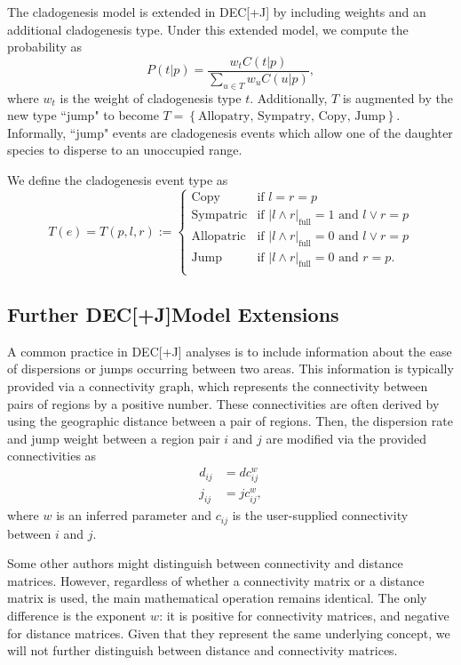 \documentclass[a4paper]{article}
\newcommand{\CountFull}[1]{|#1|_\text{full}}
\newcommand{\decj}{DEC[+J]}
\newcommand{\rand}[2]{#1 \land #2}
\newcommand{\ror}[2]{#1 \lor #2}
\begin{document}
The cladogenesis model is extended in \decj{} by including weights and an additional cladogenesis type.
Under this extended model, we compute the probability as 
\begin{equation}
	P(t | p) = \frac{w_t C(t | p)}{\sum_{u \in T} w_u C(u | p)},
\end{equation}
where $w_t$ is the weight of cladogenesis type $t$.
Additionally, $T$ is augmented by the new type ``jump" to become \(T = \left\{\text{Allopatry, Sympatry, Copy,
Jump}\right\} \).
Informally, ``jump" events are cladogenesis events which allow one of the daughter species to disperse to an unoccupied
range.

We define the cladogenesis event type as
\begin{equation}
T(e) = T(p, l, r) := 
\begin{cases}
  \text{Copy} & \text{if }l = r = p \\ 
  \text{Sympatric} & \text{if } \CountFull{\rand{l}{r}} = 1 \text{ and } \ror{l}{r} = p \\ 
  \text{Allopatric} & \text{if } \CountFull{\rand{l}{r}} = 0 \text{ and } \ror{l}{r} = p   \\ 
  \text{Jump} & \text{if } \CountFull{\rand{l}{r}} = 0 \text{ and } r = p. \\ 
\end{cases}
\label{eq:clad-test}
\end{equation}

\subsection{Further \decj Model Extensions}

A common practice in \decj{} analyses is to include information about the ease of dispersions or jumps occurring
between two areas.
This information is typically provided via a connectivity graph, which represents the connectivity between pairs of regions by a
positive number.
These connectivities are often derived by using the geographic distance between a pair of regions.
Then, the dispersion rate and jump weight between a region pair $i$ and $j$ are modified via the provided connectivities
as
\begin{align*}
  d_{ij} &= d c_{ij}^w \\
  j_{ij} &= j c_{ij}^w,
\end{align*}
where $w$ is an inferred parameter and $c_{ij}$ is the user-supplied connectivity between $i$ and $j$.

Some other authors might distinguish between connectivity and distance matrices.
However, regardless of whether a connectivity matrix or a distance matrix is used, the main mathematical operation remains identical.
The only difference is the exponent $w$: it is positive for connectivity matrices, and negative for
distance matrices.
Given that they represent the same underlying concept, we will not further distinguish between distance and connectivity matrices.
\end{document}
